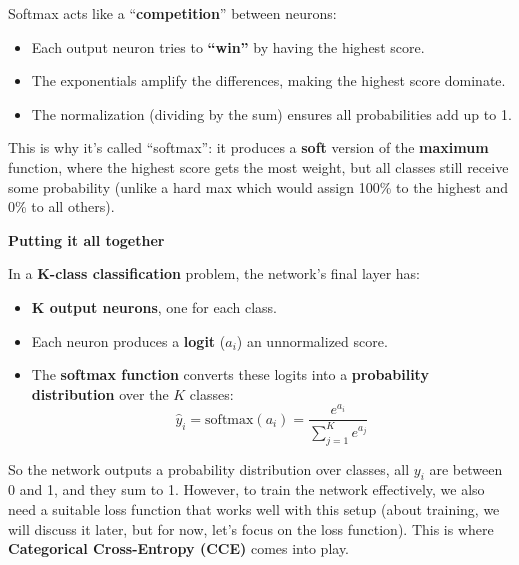 \noindent
Softmax acts like a ``\textbf{competition}'' between neurons:
\begin{itemize}
    \item Each output neuron tries to \textbf{``win''} by having the highest score.
    \item The exponentials amplify the differences, making the highest score dominate.
    \item The normalization (dividing by the sum) ensures all probabilities add up to 1.
\end{itemize}
This is why it's called ``softmax'': it produces a \textbf{soft} version of the \textbf{maximum} function, where the highest score gets the most weight, but all classes still receive some probability (unlike a hard max which would assign 100\% to the highest and 0\% to all others).

\highspace
\begin{flushleft}
    \textcolor{Green3}{ \textbf{Putting it all together}}
\end{flushleft}
In a \textbf{K-class classification} problem, the network's final layer has:
\begin{itemize}
    \item \textbf{K output neurons}, one for each class.
    \item Each neuron produces a \textbf{logit} ($a_i$) an unnormalized score.
    \item The \textbf{softmax function} converts these logits into a \textbf{probability distribution} over the $K$ classes:
    \begin{equation*}
        \hat{y}_i = \text{softmax}(a_i) = \dfrac{e^{a_i}}{\displaystyle \sum_{j=1}^{K} e^{a_j}}
    \end{equation*}
\end{itemize}
So the network outputs a probability distribution over classes, all $y_{i}$ are between 0 and 1, and they sum to 1. However, to train the network effectively, we also need a suitable loss function that works well with this setup (about training, we will discuss it later, but for now, let's focus on the loss function). This is where \textbf{Categorical Cross-Entropy (CCE)} comes into play.

